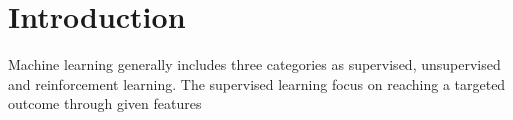 \section{Introduction}

Machine learning generally includes three categories as supervised, unsupervised and reinforcement learning. The supervised learning focus on reaching a targeted outcome through given features

